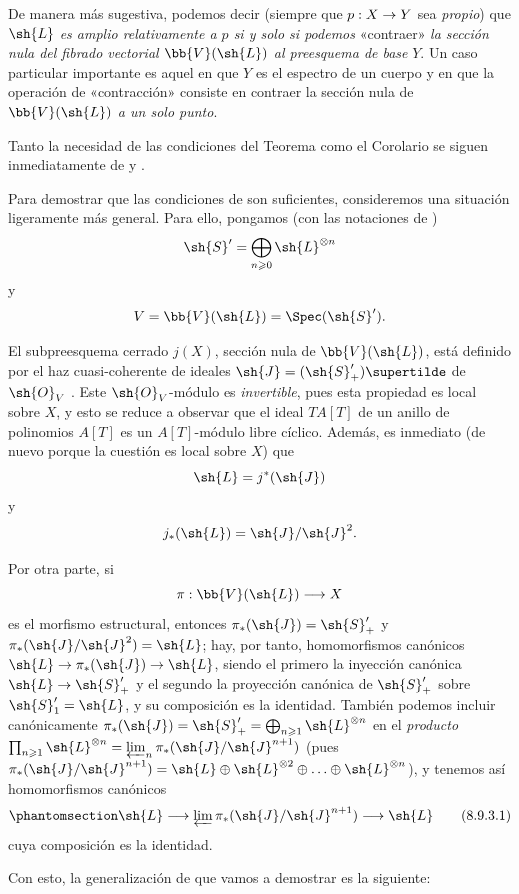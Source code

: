 \documentclass[oneside,10pt]{amsart}
\makeatletter
\renewcommand{\geq}{\geqslant}
\newcommand{\ega@arrow}[2]{\mathchoice{#1}{#2}{#2}{#2}}
\renewcommand{\to}{\ega@arrow{\longrightarrow}{\rightarrow}}
\let\EGAOriginalLabel\label
\renewcommand{\label}[1]{\phantomsection\EGAOriginalLabel{#1}}
\makeatother
\begin{document}
De manera más sugestiva, podemos decir (siempre que $p:X\to Y$ sea \emph{propio}) que $\sh{L}$ \emph{es amplio relativamente a $p$ si y solo si podemos} «contraer» \emph{la sección nula del fibrado vectorial $\bb{V}(\sh{L})$ al preesquema de base} $Y$.
Un caso particular importante es aquel en que $Y$ es el espectro de un cuerpo y en que la operación de «contracción» consiste en contraer la sección nula de $\bb{V}(\sh{L})$ \emph{a un solo punto}.

\begin{env}[8.9.3]
\label{II.8.9.3}
Tanto la necesidad de las condiciones del Teorema  como el Corolario  se siguen inmediatamente de  y .

Para demostrar que las condiciones de  son suficientes, consideremos una situación ligeramente más general.
Para ello, pongamos (con las notaciones de )
\[
  \sh{S}'=\bigoplus_{n\geq 0}\sh{L}^{\otimes n}
\]
y
\[
  V=\bb{V}(\sh{L})=\Spec(\sh{S}').
\]

El subpreesquema cerrado $j(X)$, sección nula de $\bb{V}(\sh{L})$, está definido por el haz cuasi-coherente de ideales $\sh{J}=(\sh{S}'_+)\supertilde$ de $\sh{O}_V$ .
Este $\sh{O}_V$-módulo es \emph{invertible}, pues esta propiedad es local sobre $X$, y esto se reduce a observar que el ideal $TA[T]$ de un anillo de polinomios $A[T]$ es un $A[T]$-módulo libre cíclico.
Además, es inmediato (de nuevo porque la cuestión es local sobre $X$) que
\[
  \sh{L}=j^*(\sh{J})
\]
y
\[
  j_*(\sh{L})=\sh{J}/\sh{J}^2.
\]

Por otra parte, si
\[
  \pi:\bb{V}(\sh{L})\to X
\]
es el morfismo estructural, entonces $\pi_*(\sh{J})=\sh{S}'_+$ y $\pi_*(\sh{J}/\sh{J}^2)=\sh{L}$;
hay, por tanto, homomorfismos canónicos $\sh{L}\to\pi_*(\sh{J})\to\sh{L}$, siendo el primero la inyección canónica $\sh{L}\to\sh{S}'_+$ y el segundo la proyección canónica de $\sh{S}'_+$ sobre $\sh{S}'_1=\sh{L}$, y su composición es la identidad.
También podemos incluir canónicamente $\pi_*(\sh{J}) = \sh{S}'_+ = \bigoplus_{n\geq1}\sh{L}^{\otimes n}$ en el \emph{producto} $\prod_{n\geq1}\sh{L}^{\otimes n} = \varprojlim_n \pi_*(\sh{J}/\sh{J}^{n+1})$ (pues $\pi_*(\sh{J}/\sh{J}^{n+1}) = \sh{L}\oplus\sh{L}^{\otimes 2}\oplus\ldots\oplus\sh{L}^{\otimes n}$), y tenemos así homomorfismos canónicos
\[
\label{II.8.9.3.1}
  \sh{L}\to\varprojlim\pi_*(\sh{J}/\sh{J}^{n+1})\to\sh{L}
  \tag{8.9.3.1}
\]
cuya composición es la identidad.

Con esto, la generalización de  que vamos a demostrar es la siguiente:
\end{env}
\end{document}
